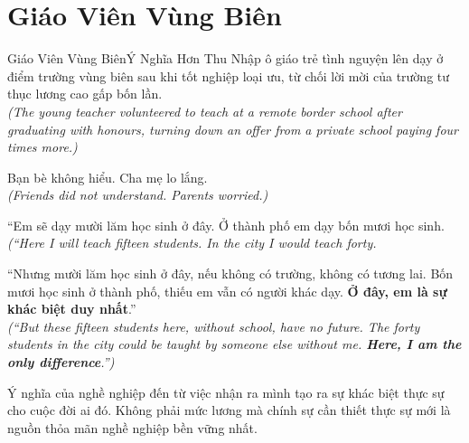 \section{Giáo Viên Vùng Biên}
\begin{truyen}{Giáo Viên Vùng Biên}{Ý Nghĩa Hơn Thu Nhập}
ô giáo trẻ tình nguyện lên dạy ở điểm trường vùng biên sau khi tốt nghiệp loại ưu, từ chối lời mời của trường tư thục lương cao gấp bốn lần.\\
\textit{(The young teacher volunteered to teach at a remote border school after graduating with honours, turning down an offer from a private school paying four times more.)}

Bạn bè không hiểu. Cha mẹ lo lắng.\\
\textit{(Friends did not understand. Parents worried.)}

``Em sẽ dạy mười lăm học sinh ở đây. Ở thành phố em dạy bốn mươi học sinh.\\
\textit{(``Here I will teach fifteen students. In the city I would teach forty.}

``Nhưng mười lăm học sinh ở đây, nếu không có trường, không có tương lai. Bốn mươi học sinh ở thành phố, thiếu em vẫn có người khác dạy. \textbf{Ở đây, em là sự khác biệt duy nhất}.''\\
\textit{(``But these fifteen students here, without school, have no future. The forty students in the city could be taught by someone else without me. \textbf{Here, I am the only difference}.'')}
\end{truyen}
\begin{baihoc}
  Ý nghĩa của nghề nghiệp đến từ việc nhận ra mình tạo ra sự khác biệt thực sự cho cuộc đời ai đó. Không phải mức lương mà chính sự cần thiết thực sự mới là nguồn thỏa mãn nghề nghiệp bền vững nhất.
\end{baihoc}

